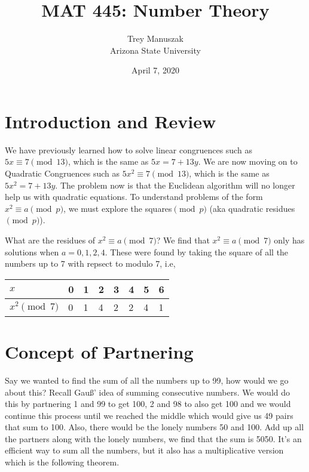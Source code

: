 \documentclass[12pt]{article}
\title{MAT 445: Number Theory}
\date{April 7, 2020}
\author{Trey Manuszak\\ Arizona State University}
\newenvironment{example}[2][Example]{\begin{trivlist}
\item[\hskip \labelsep {\bfseries #1}\hskip \labelsep {\bfseries #2}]}{\end{trivlist}}
\begin{document}

\section{Introduction and Review}

\hspace{1em} We have previously learned how to solve linear congruences such as $5x \equiv 7 \pmod{13}$, which is the same as $5x = 7 + 13y$. We are now moving on to Quadratic Congruences such as $5x^2 \equiv 7 \pmod{13}$, which is the same as $5x^2 = 7+13y$. The problem now is that the Euclidean algorithm will no longer help us with quadratic equations. To understand problems of the form $x^2 \equiv a \pmod{p}$, we must explore the squares$\pmod{p}$ (aka quadratic residues$\pmod{p}$). 

\begin{example}{1 (Quadratic Residues (mod \textit{\textbf{p}}))}
What are the residues of $x^2 \equiv a \pmod{7}$? We find that $x^2 \equiv a \pmod{7}$ only has solutions when $a = 0,1,2,4$. These were found by taking the square of all the numbers up to 7 with repsect to modulo 7, i.e, 
\begin{table}[!htbp]
  \centering
  \begin{tabular}{|l|l|l|l|l|l|l|l|}
  \hline
  $x$ & 0 & 1 & 2 & 3 & 4 & 5 & 6 \\ \hline
  $x^2 \pmod{7}$ & 0 & 1 & 4 & 2 & 2 & 4 & 1 \\ \hline
  \end{tabular}
  \end{table}
\end{example}

\section{Concept of Partnering}

Say we wanted to find the sum of all the numbers up to 99, how would we go about this? Recall Gau{\ss}' idea of summing consecutive numbers. We would do this by partnering 1 and 99 to get 100, 2 and 98 to also get 100 and we would continue this process until we reached the middle which would give us 49 pairs that sum to 100. Also, there would be the lonely numbers 50 and 100. Add up all the partners along with the lonely numbers, we find that the sum is 5050. It’s an efficient way to sum all the numbers, but it also has a multiplicative version which is the following theorem.
\end{document}
